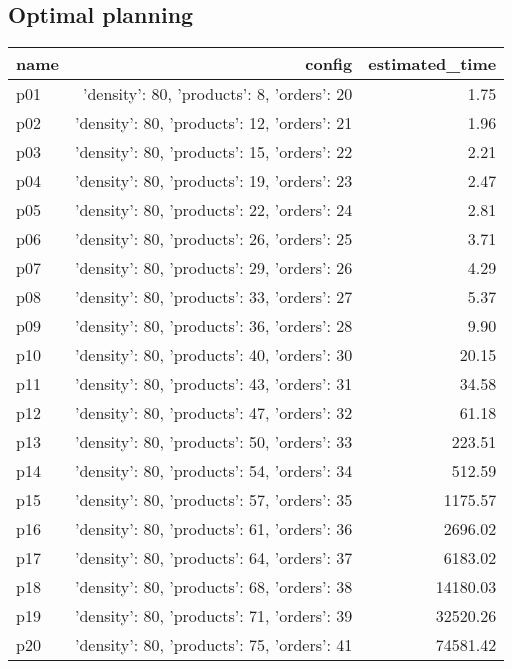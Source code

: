 \documentclass{article}
\begin{document}
                                \subsection*{Optimal planning}
                                
                            \begin{center}
                            \scriptsize
                            \begin{tabular}{@{}l|r|r@{}}
                            name & config & estimated\_time\\\midrule
                              p01&{'density': 80, 'products': 8, 'orders': 20}&1.75\\
  p02&{'density': 80, 'products': 12, 'orders': 21}&1.96\\
  p03&{'density': 80, 'products': 15, 'orders': 22}&2.21\\
  p04&{'density': 80, 'products': 19, 'orders': 23}&2.47\\
  p05&{'density': 80, 'products': 22, 'orders': 24}&2.81\\
  p06&{'density': 80, 'products': 26, 'orders': 25}&3.71\\
  p07&{'density': 80, 'products': 29, 'orders': 26}&4.29\\
  p08&{'density': 80, 'products': 33, 'orders': 27}&5.37\\
  p09&{'density': 80, 'products': 36, 'orders': 28}&9.90\\
  p10&{'density': 80, 'products': 40, 'orders': 30}&20.15\\
  p11&{'density': 80, 'products': 43, 'orders': 31}&34.58\\
  p12&{'density': 80, 'products': 47, 'orders': 32}&61.18\\
  p13&{'density': 80, 'products': 50, 'orders': 33}&223.51\\
  p14&{'density': 80, 'products': 54, 'orders': 34}&512.59\\
  p15&{'density': 80, 'products': 57, 'orders': 35}&1175.57\\
  p16&{'density': 80, 'products': 61, 'orders': 36}&2696.02\\
  p17&{'density': 80, 'products': 64, 'orders': 37}&6183.02\\
  p18&{'density': 80, 'products': 68, 'orders': 38}&14180.03\\
  p19&{'density': 80, 'products': 71, 'orders': 39}&32520.26\\
  p20&{'density': 80, 'products': 75, 'orders': 41}&74581.42\\

\end{tabular}
\end{center}
\end{document}
